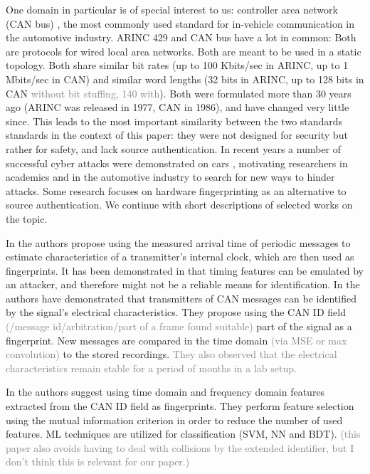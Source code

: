 \documentclass[conference]{IEEEtran}
\begin{document}
  One domain in particular is of special interest to us: controller area network (CAN bus) \cite{}, the most commonly used standard for in-vehicle communication in the automotive industry. ARINC 429 and CAN bus have a lot in common: Both are protocols for wired local area networks. Both are meant to be used in a static topology. Both share similar bit rates (up to 100 Kbits/sec in ARINC, up to 1 Mbits/sec in CAN) and similar word lengths (32 bits in ARINC, up to 128 bits in CAN \textcolor{gray}{without bit stuffing, 140 with}). Both were formulated more than 30 years ago (ARINC was released in 1977, CAN in 1986), and have changed very little since. This leads to the most important similarity between the two standards standards in the context of this paper: they were not designed for security but rather for safety, and lack source authentication.
  In recent years a number of successful cyber attacks were demonstrated on cars \cite{}, motivating researchers in academics and in the automotive industry to search for new ways to hinder attacks. Some research focuses on hardware fingerprinting as an alternative to source authentication. We continue with short descriptions of selected works on the topic.
  
  
  In \cite{cho2016fingerprinting} the authors propose using the measured arrival time of periodic messages to estimate characteristics of a transmitter's internal clock, which are then used as fingerprints. It has been demonstrated in \cite{sagong2018cloaking} that timing features can be emulated by an attacker, and therefore might not be a reliable means for identification.
  In \cite{murvay2014source} the authors have demonstrated that transmitters of CAN messages can be identified by the signal's electrical characteristics. They propose using the CAN ID field \textcolor{gray}{(/message id/arbitration/part of a frame found suitable)} part of the signal as a fingerprint. New messages are compared in the time domain \textcolor{gray}{(via MSE or max convolution)} to the stored recordings. \textcolor{gray}{They also observed that the electrical characteristics remain stable for a period of months in a lab setup.}
  
  In \cite{choi2018identifying} the authors suggest using time domain and frequency domain features extracted from the CAN ID field as fingerprints. They perform feature selection using the mutual information criterion in order to reduce the number of used features. ML techniques are utilized for classification (SVM, NN and BDT). \textcolor{gray}{(this paper also avoids having to deal with collisions by the extended identifier, but I don't think this is relevant for our paper.)}
  
\end{document}
